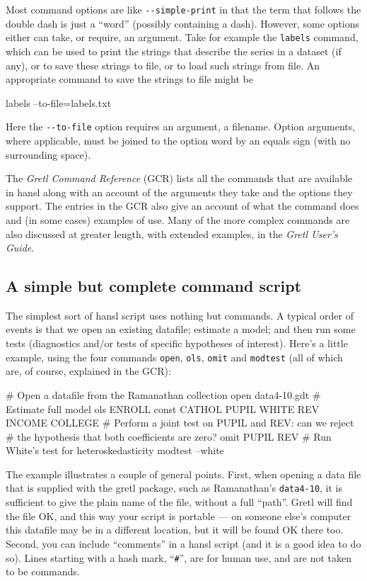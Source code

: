 Most command options are like \verb|--simple-print| in that the term
that follows the double dash is just a ``word'' (possibly containing a
dash). However, some options either can take, or require, an
argument. Take for example the \texttt{labels} command, which can be
used to print the strings that describe the series in a dataset (if
any), or to save these strings to file, or to load such strings from
file. An appropriate command to save the strings to file might be
%
\begin{code}
labels --to-file=labels.txt
\end{code}
%
Here the \verb|--to-file| option requires an argument, a filename.
Option arguments, where applicable, must be joined to the option
word by an equals sign (with no surrounding space).

The \textit{Gretl Command Reference} (GCR) lists all the commands that
are available in hansl along with an account of the arguments they
take and the options they support. The entries in the GCR also give an
account of what the command does and (in some cases) examples of use.
Many of the more complex commands are also discussed at greater
length, with extended examples, in the \textit{Gretl User's Guide}.

\subsection{A simple but complete command script}

The simplest sort of hansl script uses nothing but commands. A typical
order of events is that we open an existing datafile; estimate a
model; and then run some tests (diagnostics and/or tests of specific
hypotheses of interest). Here's a little example, using the four
commands \texttt{open}, \texttt{ols}, \texttt{omit} and
\texttt{modtest} (all of which are, of course, explained in the GCR):
%
\begin{code}
# Open a datafile from the Ramanathan collection
open data4-10.gdt
# Estimate full model
ols ENROLL const CATHOL PUPIL WHITE REV INCOME COLLEGE
# Perform a joint test on PUPIL and REV: can we reject
# the hypothesis that both coefficients are zero?
omit PUPIL REV
# Run White's test for heteroskedasticity
modtest --white
\end{code}

The example illustrates a couple of general points. First, when
opening a data file that is supplied with the gretl package, such as
Ramanathan's \texttt{data4-10}, it is sufficient to give the plain
name of the file, without a full ``path''. Gretl will find the file
OK, and this way your script is portable --- on someone else's
computer this datafile may be in a different location, but it will be
found OK there too. Second, you can include ``comments'' in a hansl
script (and it is a good idea to do so). Lines starting with a hash
mark, ``\texttt{\#}'', are for human use, and are not taken to be
commands.

